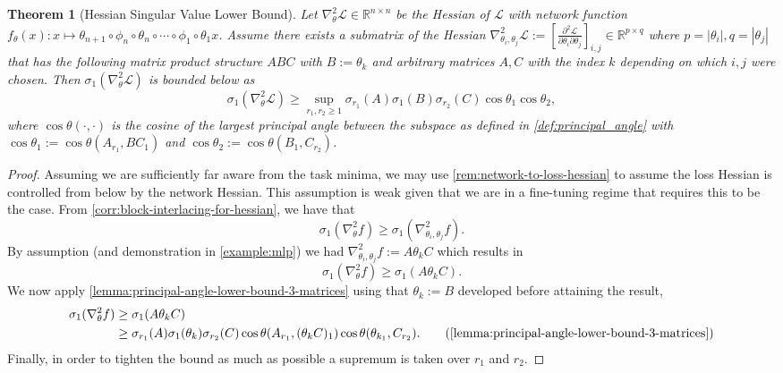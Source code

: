 \documentclass{article}
\newcommand{\prinangle}{\cos\theta}
\theoremstyle{plain}
\newtheorem{theorem}{Theorem}
\theoremstyle{definition}
\theoremstyle{remark}
\begin{document}
\begin{theorem}[Hessian Singular Value Lower Bound]
\label{thm:hessian-singular-value-bound-app}
Let $\nabla^2_{\theta}\mathcal{L} \in \mathbb{R}^{n \times n}$ be the Hessian of $\mathcal{L}$ with network function $f_\theta(x): x \mapsto  \theta_{n+1} \circ \phi_{n} \circ \theta_{n} \circ \cdots \circ \phi_1 \circ \theta_1x$. Assume there exists a submatrix of the Hessian          $\nabla^2_{\theta_i,\theta_j} \mathcal{L} :=  \left[\frac{\partial^2 \mathcal{L}}{\partial \theta_i \partial \theta_j}\right]_{i, j} \in \mathbb{R}^{p \times q}$ where $p = |\theta_i|, q = |\theta_j|$ that has the following matrix product structure $ABC$ with $B := \theta_k$ and arbitrary matrices $A,C$ with the index $k$ depending on which $i,j$ were chosen. Then $\sigma_1(\nabla^2_{\theta}\mathcal{L})$ is bounded below as \[
\sigma_1(\nabla^2_{\theta}\mathcal{L}) \geq \sup_{r_1,r_2 \geq 1} \sigma_{r_1}(A)\sigma_{1}(B)\sigma_{r_2}(C) \prinangle_1\prinangle_2,
\] where $\prinangle(\cdot, \cdot)$ is the cosine of the largest principal angle between the subspace as defined in \cref{def:principal_angle} with $\prinangle_1 := \prinangle(A_{r_1},BC_1)$ and $\prinangle_2 :=\prinangle(B_1, C_{r_2})$.
\end{theorem}
\begin{proof}
Assuming we are sufficiently far aware from the task minima, we may use \cref{rem:network-to-loss-hessian} to assume the loss Hessian is controlled from below by the network Hessian. This assumption is weak given that we are in a fine-tuning regime that requires this to be the case.
From \cref{corr:block-interlacing-for-hessian}, we have that \[
\sigma_1(\nabla^2_{\theta}f) \ge \sigma_1(\nabla^2_{\theta_i, \theta_j} f).
\] By assumption (and demonstration in \cref{example:mlp}) we had $\nabla^2_{\theta_i, \theta_j}f := A\theta_kC$ which results in \[
 \sigma_1(\nabla^2_{\theta}f) \geq \sigma_1(A\theta_kC).
\] We now apply \cref{lemma:principal-angle-lower-bound-3-matrices} using that $\theta_k := B$ developed before attaining the result,
\begin{align*}
 \sigma_1(\nabla^2_{\theta}f) & \geq\sigma_1(A\theta_kC)  \\
 &\geq \sigma_{r_1}(A)\sigma_1(\theta_k) \sigma_{r_2}(C)\prinangle{(A_{r_1},(\theta_kC)_1)} \prinangle{(\theta_{k_1},C_{r_2})}. \tag{\cref{lemma:principal-angle-lower-bound-3-matrices}} \\
\end{align*}
Finally, in order to tighten the bound as much as possible a supremum is taken over $r_1$ and $r_2$.
\end{proof}
\end{document}
